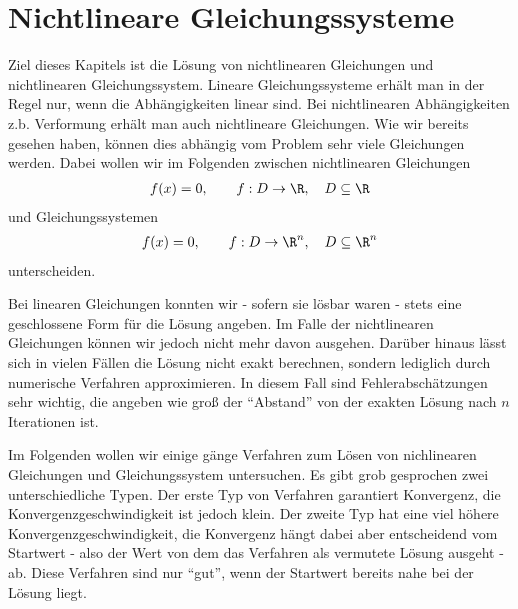 \section{Nichtlineare Gleichungssysteme}

Ziel dieses Kapitels ist die Lösung von nichtlinearen Gleichungen und
nichtlinearen Gleichungssystem. Lineare Gleichungssysteme erhält man in der Regel nur, wenn die Abhängigkeiten
linear sind. Bei nichtlinearen Abhängigkeiten z.b. Verformung erhält man auch
nichtlineare Gleichungen. Wie wir bereits gesehen haben, können dies abhängig
vom Problem sehr viele Gleichungen werden.
Dabei wollen wir im Folgenden zwischen nichtlinearen Gleichungen
\begin{align*}
f(x) = 0,\qquad f: D\to \R,\quad D\subseteq \R
\end{align*}
und Gleichungssystemen
\begin{align*}
f(x) = 0,\qquad f: D\to \R^n,\quad D\subseteq \R^n 
\end{align*}
unterscheiden.

Bei linearen Gleichungen konnten wir - sofern sie lösbar waren - stets eine
geschlossene Form für die Lösung angeben. Im Falle der nichtlinearen Gleichungen
können wir jedoch nicht mehr davon ausgehen. Darüber hinaus lässt sich in
vielen Fällen die Lösung nicht exakt berechnen, sondern lediglich durch
numerische Verfahren approximieren. In diesem Fall sind Fehlerabschätzungen
sehr wichtig, die angeben wie groß der ``Abstand'' von der exakten Lösung nach
$n$ Iterationen ist.

Im Folgenden wollen wir einige gänge Verfahren zum Lösen von nichlinearen
Gleichungen und Gleichungssystem untersuchen. Es gibt grob gesprochen zwei
unterschiedliche Typen. Der erste Typ von Verfahren garantiert Konvergenz, die
Konvergenzgeschwindigkeit ist jedoch klein. Der zweite Typ hat eine viel höhere
Konvergenzgeschwindigkeit, die Konvergenz hängt dabei aber entscheidend vom
Startwert - also der Wert von dem das Verfahren als vermutete Lösung ausgeht -
ab. Diese Verfahren sind nur ``gut'', wenn der Startwert bereits nahe bei der
Lösung liegt.

